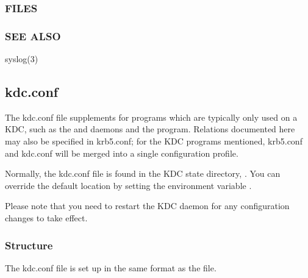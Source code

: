 \documentclass[letterpaper,10pt,english]{sphinxmanual}
\begin{document}
\subsubsection{FILES}
\label{\detokenize{admin/conf_files/krb5_conf:files}}
\sphinxAtStartPar
{}


\subsubsection{SEE ALSO}
\label{\detokenize{admin/conf_files/krb5_conf:see-also}}
\sphinxAtStartPar
syslog(3)


\subsection{kdc.conf}
\label{\detokenize{admin/conf_files/kdc_conf:kdc-conf}}\label{\detokenize{admin/conf_files/kdc_conf:kdc-conf-5}}\label{\detokenize{admin/conf_files/kdc_conf::doc}}
\sphinxAtStartPar
The kdc.conf file supplements {\hyperref[\detokenize{admin/conf_files/krb5_conf:krb5-conf-5}]{}} for programs which
are typically only used on a KDC, such as the {\hyperref[\detokenize{admin/admin_commands/krb5kdc:krb5kdc-8}]{}} and
{\hyperref[\detokenize{admin/admin_commands/kadmind:kadmind-8}]{}} daemons and the {\hyperref[\detokenize{admin/admin_commands/kdb5_util:kdb5-util-8}]{}} program.
Relations documented here may also be specified in krb5.conf; for the
KDC programs mentioned, krb5.conf and kdc.conf will be merged into a
single configuration profile.

\sphinxAtStartPar
Normally, the kdc.conf file is found in the KDC state directory,
{\hyperref[\detokenize{mitK5defaults:paths}]{}}.  You can override the default location by setting the
environment variable .

\sphinxAtStartPar
Please note that you need to restart the KDC daemon for any configuration
changes to take effect.


\subsubsection{Structure}
\label{\detokenize{admin/conf_files/kdc_conf:structure}}
\sphinxAtStartPar
The kdc.conf file is set up in the same format as the
{\hyperref[\detokenize{admin/conf_files/krb5_conf:krb5-conf-5}]{}} file.
\end{document}
